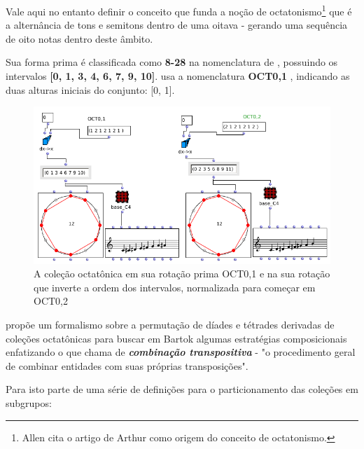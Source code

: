 \documentclass[
	12pt,				%
	openright,			%
	twoside,			%
	a4paper,			%
	english,			%
	french,				%
	spanish,			%
	brazil				%
	]{abntex2}
\begin{document}
Vale aqui no entanto definir o conceito que funda a noção de octatonismo\footnote{Allen  cita o artigo de Arthur  como origem do conceito de octatonismo.} que é a alternância de tons e semitons dentro de uma oitava - gerando uma sequência de oito notas dentro deste âmbito. 

Sua forma prima é classificada como\textbf{ 8-28} na nomenclatura de , possuindo os intervalos \textbf{[0, 1, 3, 4, 6, 7, 9, 10]}.  usa a nomenclatura  \textbf{OCT0,1 }, indicando as duas alturas iniciais do conjunto: [0, 1].

\begin{figure}[!h]
	\caption{\label{fig_grafico} A coleção octatônica em sua rotação prima OCT0,1 e na sua rotação que inverte a ordem dos intervalos, normalizada para começar em OCT0,2}
	\begin{center}
	    \includegraphics[scale=0.5]{octa/octaOM.png}
	\end{center}
\end{figure}

 propõe um formalismo sobre a permutação de díades e tétrades derivadas de coleções octatônicas para buscar em Bartok algumas estratégias composicionais enfatizando o que chama de \textbf{\textit{combinação transpositiva}} - "o procedimento geral de combinar entidades com suas próprias transposições".\cite[p. x]{cohn1991bartok}

Para isto parte de uma série de definições para o particionamento das coleções em subgrupos:
\end{document}
